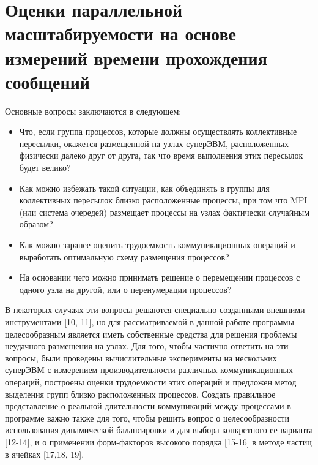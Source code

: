 		
        \section{Оценки параллельной масштабируемости на основе измерений времени прохождения сообщений}
        
        Основные вопросы заключаются в следующем:
        \begin{itemize} 
        \item Что, если группа процессов, которые должны осуществлять коллективные пересылки, окажется размещенной на узлах суперЭВМ, расположенных физически далеко друг от друга, так что время выполнения этих пересылок будет велико?
        \item Как можно избежать такой ситуации, как объединять в группы для коллективных пересылок близко расположенные процессы, при том что MPI (или система очередей) размещает процессы на узлах фактически случайным образом? 
        \item Как можно заранее оценить трудоемкость коммуникационных операций и выработать оптимальную схему размещения процессов? 
        \item На основании чего можно принимать решение о перемещении процессов с одного узла на другой, или о перенумерации процессов?
        \end{itemize} 
        В некоторых случаях эти вопросы решаются специально созданными внешними инструментами [10, 11], но для рассматриваемой в данной работе программы целесообразным является иметь собственные средства для решения проблемы неудачного размещения на узлах.
        Для того, чтобы частично ответить на эти вопросы, были проведены вычислительные эксперименты на нескольких суперЭВМ с измерением производительности различных коммуникационных операций, построены оценки трудоемкости этих операций и предложен метод выделения групп близко расположенных процессов. Создать правильное представление о реальной длительности коммуникаций между процессами в программе важно также для того, чтобы решить вопрос о целесообразности использования динамической балансировки и для выбора конкретного ее варианта [12-14], и о применении форм-факторов высокого порядка [15-16] в методе частиц в ячейках [17,18, 19]. 
        
